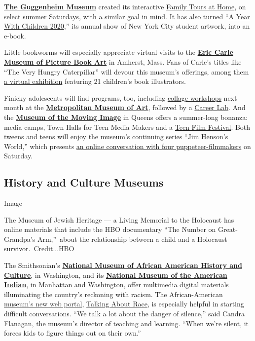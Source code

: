 \textbf{\href{https://www.guggenheim.org/}{The Guggenheim Museum}}
created its interactive
\href{https://www.guggenheim.org/event/guggenheim-family-tours-at-home}{Family
Tours at Home}, on select summer Saturdays, with a similar goal in mind.
It has also turned
``\href{https://www.guggenheim.org/exhibition/a-year-with-children-2020}{A
Year With Children 2020},'' its annual show of New York City student
artwork, into an e-book.

Little bookworms will especially appreciate virtual visits to the
\textbf{\href{https://www.carlemuseum.org/}{Eric Carle Museum of Picture
Book Art}} in Amherst, Mass. Fans of Carle's titles like ``The Very
Hungry Caterpillar'' will devour this museum's offerings, among them
\href{https://sway.office.com/4gm5EH94jhEswJ7z}{a virtual exhibition}
featuring 21 children's book illustrators.

Finicky adolescents will find programs, too, including
\href{https://www.metmuseum.org/events/programs/teens/teen-studio}{collage
workshops} next month at the
\textbf{\href{https://www.metmuseum.org/}{Metropolitan Museum of Art}},
followed by a
\href{https://www.metmuseum.org/events/programs/teens/career-labs}{Career
Lab}. And the \textbf{\href{http://www.movingimage.us/}{Museum of the
Moving Image}} in Queens offers a summer-long bonanza: media camps, Town
Halls for Teen Media Makers and a
\href{http://www.movingimage.us/education/teencouncil}{Teen Film
Festival}. Both tweens and teens will enjoy the museum's continuing
series ``Jim Henson's World,'' which presents
\href{http://www.movingimage.us/visit/calendar/2020/06/20/detail/jim-hensons-world-new-visions-of-puppets-on-screen}{an
online conversation with four puppeteer-filmmakers} on Saturday.

\hypertarget{history-and-culture-museums}{%
\subsection{History and Culture
Museums}\label{history-and-culture-museums}}

Image

The Museum of Jewish Heritage --- a Living Memorial to the Holocaust has
online materials that include the HBO documentary ``The Number on
Great-Grandpa's Arm,''~about the relationship between a child and a
Holocaust survivor.~Credit...HBO

The Smithsonian's \textbf{\href{https://nmaahc.si.edu/}{National Museum
of African American History and Culture}}, in Washington, and its
\textbf{\href{https://americanindian.si.edu/}{National Museum of the
American Indian}}, in Manhattan and Washington, offer multimedia digital
materials illuminating the country's reckoning with racism. The
African-American
\href{https://www.nytimes3xbfgragh.onion/2020/06/11/arts/design/museums-protests-race-smithsonian.html}{museum's
new web portal},
\href{https://nmaahc.si.edu/learn/talking-about-race}{Talking About
Race}, is especially helpful in starting difficult conversations. ``We
talk a lot about the danger of silence,'' said Candra Flanagan, the
museum's director of teaching and learning. ``When we're silent, it
forces kids to figure things out on their own.''

